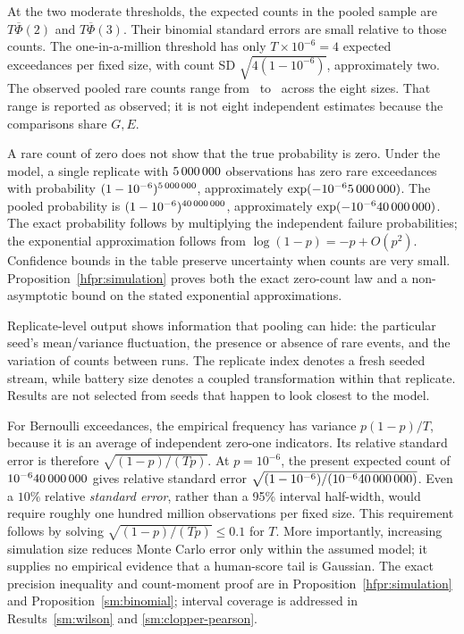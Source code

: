 At the two moderate thresholds, the expected counts in the pooled sample
are \(T\overline\Phi(2)\) and \(T\overline\Phi(3)\).
Their binomial standard errors are small relative to those counts.
The one-in-a-million threshold has only \(T\times10^{-6}=4\) expected
exceedances per fixed size, with count SD
\(\sqrt{4(1-10^{-6})}\), approximately two. The observed pooled rare
counts range from \SimRareMin\ to \SimRareMax\ across the eight sizes.
That range is reported as observed; it is not eight independent estimates
because the comparisons share \(G,E\).

A rare count of zero does not show that the true probability is zero.
Under the model, a single replicate with \(5\,000\,000\) observations
has zero rare exceedances with probability
\((1-10^{-6})^{5\,000\,000}\), approximately
\(\exp(-10^{-6}5\,000\,000)\). The pooled probability is
\((1-10^{-6})^{40\,000\,000}\), approximately
\(\exp(-10^{-6}40\,000\,000)\).
The exact probability follows by multiplying the independent failure
probabilities; the exponential approximation follows from
\(\log(1-p)=-p+O(p^2)\). Confidence bounds in the table preserve
uncertainty when counts are very small.
Proposition~\ref{hfpr:simulation} proves both the exact zero-count law
and a non-asymptotic bound on the stated exponential approximations.

\begingroup\small

\endgroup
Replicate-level output shows information that pooling can hide: the
particular seed's mean/variance fluctuation, the presence or absence of
rare events, and the variation of counts between runs. The replicate
index denotes a fresh seeded stream, while battery size denotes a
coupled transformation within that replicate. Results are not selected
from seeds that happen to look closest to the model.

For Bernoulli exceedances, the empirical frequency has variance
\(p(1-p)/T\), because it is an average of independent zero-one
indicators. Its relative standard error is therefore
\(\sqrt{(1-p)/(Tp)}\). At \(p=10^{-6}\), the present expected count
of \(10^{-6}40\,000\,000\) gives relative standard error
\(\sqrt{(1-10^{-6})/(10^{-6}40\,000\,000)}\).
Even a
\(10\%\) relative \emph{standard error}, rather than a 95\% interval
half-width, would require roughly one hundred million observations
per fixed size. This requirement follows by solving
\(\sqrt{(1-p)/(Tp)}\leq0.1\) for \(T\). More importantly, increasing
simulation size reduces Monte Carlo error only within the assumed model;
it supplies no empirical evidence that a human-score tail is Gaussian.
The exact precision inequality and count-moment proof are in
Proposition~\ref{hfpr:simulation} and
Proposition~\ref{sm:binomial}; interval coverage is addressed in
Results~\ref{sm:wilson} and \ref{sm:clopper-pearson}.

